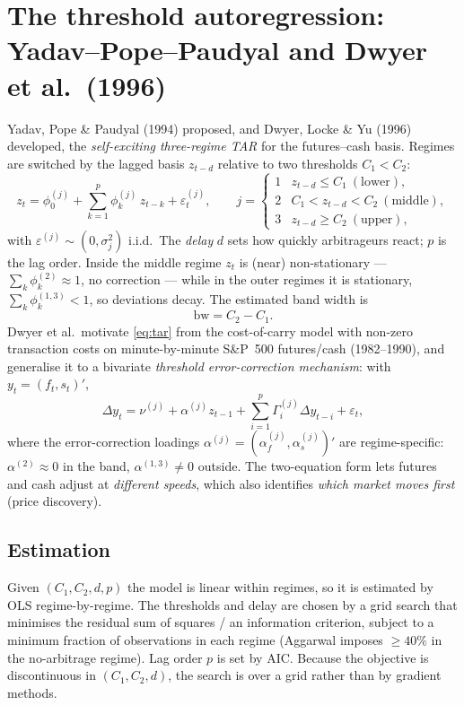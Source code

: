 \section{The threshold autoregression: Yadav--Pope--Paudyal and Dwyer et al.\ (1996)}
\label{sec:tar}
Yadav, Pope \& Paudyal (1994) proposed, and Dwyer, Locke \& Yu (1996) developed, the \emph{self-exciting three-regime TAR} for the futures--cash basis. Regimes are switched by the lagged basis $z_{t-d}$ relative to two thresholds $C_1<C_2$:
\begin{equation}
z_t = \phi_0^{(j)} + \sum_{k=1}^{p}\phi_k^{(j)}\,z_{t-k} + \varepsilon_t^{(j)}, \qquad
j = \begin{cases} 1 & z_{t-d}\le C_1 \ (\text{lower}),\\ 2 & C_1<z_{t-d}<C_2 \ (\text{middle}),\\ 3 & z_{t-d}\ge C_2 \ (\text{upper}), \end{cases} \label{eq:tar}
\end{equation}
with $\varepsilon^{(j)}\sim(0,\sigma_j^2)$ i.i.d.\ The \emph{delay} $d$ sets how quickly arbitrageurs react; $p$ is the lag order. Inside the middle regime $z_t$ is (near) non-stationary --- $\sum_k \phi_k^{(2)}\approx 1$, no correction --- while in the outer regimes it is stationary, $\sum_k\phi_k^{(1,3)}<1$, so deviations decay. The estimated band width is
\begin{equation}
\text{bw} = C_2 - C_1 .
\end{equation}
Dwyer et al.\ motivate \eqref{eq:tar} from the cost-of-carry model with non-zero transaction costs on minute-by-minute S\&P~500 futures/cash (1982--1990), and generalise it to a bivariate \emph{threshold error-correction mechanism}: with $y_t=(f_t,s_t)'$,
\begin{equation}
\Delta y_t = \nu^{(j)} + \alpha^{(j)} z_{t-1} + \sum_{i=1}^{p}\Gamma_i^{(j)}\Delta y_{t-i} + \varepsilon_t, \label{eq:tecm}
\end{equation}
where the error-correction loadings $\alpha^{(j)}=(\alpha_f^{(j)},\alpha_s^{(j)})'$ are regime-specific: $\alpha^{(2)}\approx 0$ in the band, $\alpha^{(1,3)}\ne 0$ outside. The two-equation form lets futures and cash adjust at \emph{different speeds}, which also identifies \emph{which market moves first} (price discovery).

\subsection*{Estimation}
Given $(C_1,C_2,d,p)$ the model is linear within regimes, so it is estimated by OLS regime-by-regime. The thresholds and delay are chosen by a grid search that minimises the residual sum of squares / an information criterion, subject to a minimum fraction of observations in each regime (Aggarwal imposes $\ge 40\%$ in the no-arbitrage regime). Lag order $p$ is set by AIC. Because the objective is discontinuous in $(C_1,C_2,d)$, the search is over a grid rather than by gradient methods.

